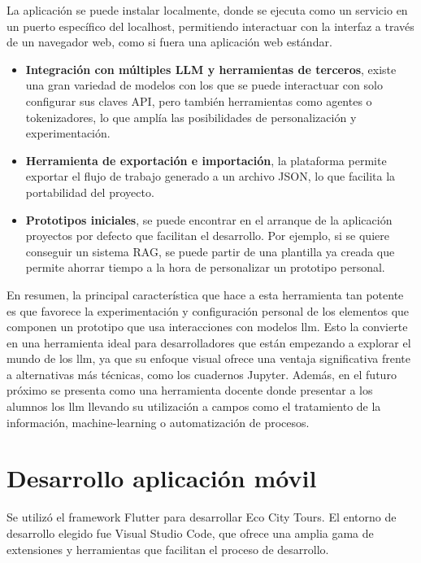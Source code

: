 	La aplicación se puede instalar localmente, donde se ejecuta como un servicio en un puerto específico del localhost, permitiendo interactuar con la interfaz a través de un navegador web, como si fuera una aplicación web estándar.
	\begin{itemize}
		
		\item \textbf{Integración con múltiples LLM y herramientas de terceros}, existe una gran variedad de modelos con los que se puede interactuar con solo configurar sus claves API, pero también herramientas como agentes o tokenizadores, lo que amplía las posibilidades de personalización y experimentación.
		
		\item \textbf{Herramienta de exportación e importación}, la plataforma permite exportar el flujo de trabajo generado a un archivo JSON, lo que facilita la portabilidad del proyecto.
		
		\item \textbf{Prototipos iniciales}, se puede encontrar en el arranque de la aplicación proyectos por defecto que facilitan el desarrollo. Por ejemplo, si se quiere conseguir un sistema RAG, se puede partir de una plantilla ya creada que permite ahorrar tiempo a la hora de personalizar un prototipo personal.
	
	\end{itemize}
	En resumen, la principal característica que hace a esta herramienta tan potente es que favorece la experimentación y configuración personal de los elementos que componen un prototipo que usa interacciones con modelos \acrshort{llm}. Esto la convierte en una herramienta ideal para desarrolladores que están empezando a explorar el mundo de los \acrshort{llm}, ya que su enfoque visual ofrece una ventaja significativa frente a alternativas más técnicas, como los cuadernos Jupyter. Además, en el futuro próximo se presenta como una herramienta docente donde presentar a los alumnos los \acrlong{llm} llevando su utilización a campos como el tratamiento de la información, machine-learning o automatización de procesos.

\section{Desarrollo aplicación móvil}
Se utilizó el framework Flutter\cite{flutter} para desarrollar Eco City Tours. El entorno de desarrollo elegido fue Visual Studio Code, que ofrece una amplia gama de extensiones y herramientas que facilitan el proceso de desarrollo.
	
